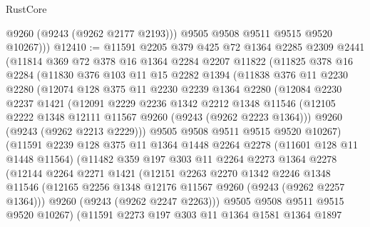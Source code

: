 \begin{lexlean}{RustCore}
\begin{coremodule}
            @9260
            (@9243 (@9262 @2177 @2193)))
          @9505
          @9508
          @9511
          @9515
          @9520
          @10267)))
@12410 := @11591
    @2205
    @379
    @425
    @72
    @1364
    @2285
    @2309
    @2441
    (@11814
      @369
      @72
      @378
      @16
      @1364
      @2284
      @2207
      @11822
      (@11825
        @378
        @16
        @2284
        (@11830
          @376
          @103
          @11
          @15
          @2282
          @1394
          (@11838
            @376
            @11
            @2230
            @2280
            (@12074
              @128
              @375
              @11
              @2230
              @2239
              @1364
              @2280
              (@12084
                @2230
                @2237
                @1421
                (@12091
                  @2229
                  @2236
                  @1342
                  @2212
                  @1348
                  @11546
                  (@12105 @2222 @1348 @12111 @11567 @9260 (@9243 (@9262 @2223 @1364)))
                  @9260
                  (@9243 (@9262 @2213 @2229)))
                @9505
                @9508
                @9511
                @9515
                @9520
                @10267)
              (@11591
                @2239
                @128
                @375
                @11
                @1364
                @1448
                @2264
                @2278
                (@11601 @128 @11 @1448 @11564)
                (@11482
                  @359
                  @197
                  @303
                  @11
                  @2264
                  @2273
                  @1364
                  @2278
                  (@12144
                    @2264
                    @2271
                    @1421
                    (@12151
                      @2263
                      @2270
                      @1342
                      @2246
                      @1348
                      @11546
                      (@12165 @2256 @1348 @12176 @11567 @9260 (@9243 (@9262 @2257 @1364)))
                      @9260
                      (@9243 (@9262 @2247 @2263)))
                    @9505
                    @9508
                    @9511
                    @9515
                    @9520
                    @10267)
                  (@11591
                    @2273
                    @197
                    @303
                    @11
                    @1364
                    @1581
                    @1364
                    @1897

\end{coremodule}
\end{lexlean}
